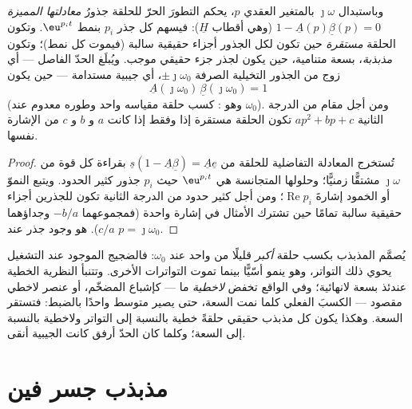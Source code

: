 \begin{theorem}\label{thm:b2:feedback-oscillators:stability}
وباستبدال $\jmath\omega$ بالمتغير العقدي $p$، يحكم التطورَ الحرّ
للحلقة جذورُ \emph{معادلتها المميزة}
$1 - \underline A(p)\underline\beta(p) = 0$ (وهي أقطاب $\underline H$): فيسهم كل جذر
$p_i$ بنمط $\eu^{p_it}$. وتكون الحلقة \emph{مستقرة} حين تكون
لكل الجذور أجزاء حقيقية سالبة (فيموت كل نمط)؛ وتكون
\emph{مذبذبة}، بسعة متنامية، حين يكون لجذر جزء حقيقي
موجب. ويُبلَغ الحدّ الفاصل --- أي زوج من الجذور التخيلية الصرفة $\pm\jmath
\omega_0$، أي جيبية مستدامة --- حين يكون
\[
\underline A(\jmath\omega_0)\,\underline\beta(\jmath\omega_0) = 1
\]
(وهو \emph{}: كسب حلقة مقياسه واحد وطوره
معدوم عند $\omega_0$). ومن أجل مقام من الدرجة الثانية $ap^2 + bp + c$ تكون
الحلقة مستقرة إذا وفقط إذا كانت $a$ و $b$ و $c$ من الإشارة نفسها.
\end{theorem}

\begin{proof}
تُستخرج المعادلة التفاضلية للحلقة من $\underline s(1 -
\underline A\underline\beta) = \underline A\underline e$ بقراءة كل قوة من $\jmath\omega$
مشتقًّا زمنيًّا؛ وحلولها المتجانسة هي $\eu^{p_it}$
حيث $p_i$ جذور كثير الحدود. ويتبع النموّ أو الخمود
إشارةَ $\operatorname{Re}p_i$؛ ومن أجل كثير حدود من الدرجة الثانية تكون للجذرين
أجزاء حقيقية سالبة تمامًا حين تشترك الأمثال في إشارة واحدة
(فمجموعهما $-b/a$ وجداؤهما $c/a$). 
هو وجود جذر عند $p = \jmath\omega_0$.
\end{proof}

\begin{remark}\label{rem:b2:feedback-oscillators:start}
يُصمَّم المذبذب بكسب حلقة \emph{أكبر} قليلًا من
واحد عند $\omega_0$: فالضجيج الموجود عند التشغيل يحوي ذلك التواتر،
وهو ينمو أسّيًّا بينما تموت التواترات الأخرى. وتتنبأ النظرية الخطية عندئذ
بسعة لانهائية؛ وفي الواقع تخفض \emph{لاخطية} ما ---
كإشباع المضخّم، أو عنصر لاخطي مقصود ---
الكسبَ الفعلي كلما نمت السعة، حتى يصير متوسط
 واحدًا بالضبط: فتستقر السعة. وهكذا يكون كل مذبذب
حقيقي حلقةً خطية بالنسبة إلى التواتر ولاخطية بالنسبة إلى
السعة؛ وكلما كان الحدّ أرفق كانت الجيبية أنقى.
\end{remark}

\section{مذبذب جسر فين}

